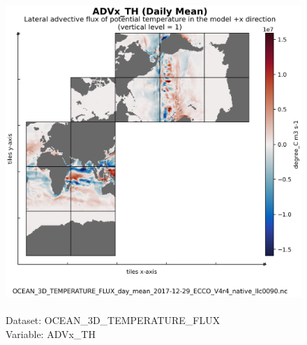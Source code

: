 \begin{figure}[H]
\centering
\includegraphics[scale=0.5]{../images/plots/native_plots/Ocean_Three-Dimensional_Potential_Temperature_Fluxes/ADVx_TH.png}
\caption{\\Dataset: OCEAN\_3D\_TEMPERATURE\_FLUX\\Variable: ADVx\_TH}
\label{tab:table-OCEAN_3D_TEMPERATURE_FLUX_ADVx_TH-Plot}
\end{figure}
\pagebreak
